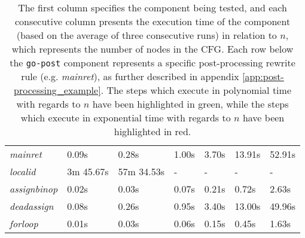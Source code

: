 \begin{table}[htbp]
\begin{center}
\begin{tabular}{|l|l|l|l|l|l|l|}
			\rowcolor{light_green_3}
			\textit{mainret} & 0.09s & 0.28s & 1.00s & 3.70s & 13.91s & 52.91s \\
			\rowcolor{light_red_3}
			\textit{localid} & 3m 45.67s & 57m 34.53s & - & - & - & - \\
			\rowcolor{light_green_3}
			\textit{assignbinop} & 0.02s & 0.03s & 0.07s & 0.21s & 0.72s & 2.63s \\
			\rowcolor{light_green_3}
			\textit{deadassign} & 0.08s & 0.26s & 0.95s & 3.40s & 13.00s & 49.96s \\
			\rowcolor{light_green_3}
			\textit{forloop} & 0.01s & 0.03s & 0.06s & 0.15s & 0.45s & 1.63s \\
			\hline
		\end{tabular}
	\end{center}
	\caption{The first column specifies the component being tested, and each consecutive column presents the execution time of the component (based on the average of three consecutive runs) in relation to $ n $, which represents the number of nodes in the CFG. Each row below the \texttt{go-post} component represents a specific post-processing rewrite rule (e.g. \textit{mainret}), as further described in appendix \ref{app:post-processing_example}. The steps which execute in polynomial time with regards to $ n $ have been highlighted in green, while the steps which execute in exponential time with regards to $ n $ have been highlighted in red.}
	\label{tbl:run_time_summary}
\end{table}

